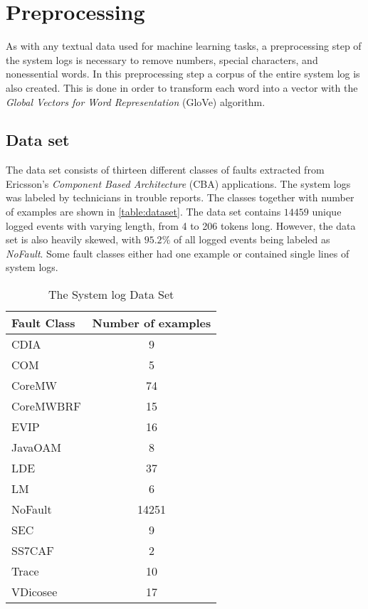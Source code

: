 \section{Preprocessing}
As with any textual data used for machine learning tasks, a preprocessing step of the system logs is necessary to remove numbers, special characters, and nonessential words. In this preprocessing step a corpus of the entire system log is also created. This is done in order to transform each word into a vector with the \textit{Global Vectors for Word Representation} (GloVe) algorithm. 


\subsection{Data set}
The data set consists of thirteen different classes of faults extracted from Ericsson's \textit{Component Based Architecture} (CBA) applications. The system logs was labeled by technicians in trouble reports. The classes together with number of examples are shown in \autoref{table:dataset}. The data set contains $14459$ unique logged events with varying length, from 4 to 206 tokens long. However, the data set is also heavily skewed, with $95.2 \%$ of all logged events being labeled as \textit{NoFault}. Some fault classes either had one example or contained single lines of system logs.



\begin{table}
\centering
\caption{The System log Data Set}
\label{table:dataset}
\begin{tabularx}{10cm}{p{5.5cm} c}
\toprule
Fault Class     & Number of examples \\ 
\midrule
         CDIA  & 9\\
         COM  & 5\\
         CoreMW  & 74\\
         CoreMWBRF  & 15\\
         EVIP  & 16\\
         JavaOAM  & 8\\
         LDE  & 37\\
         LM  & 6\\
         NoFault  & 14251\\
         SEC  & 9\\
         SS7CAF  & 2\\
         Trace  & 10\\  
         VDicosee  & 17\\
 
\bottomrule
\end{tabularx}
\end{table}



